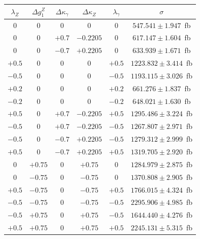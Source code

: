 \begin{table}[!ht]
  \begin{center}
  \begin{tabular} {|c c c|c c|c|}
\hline
  $\lambda_Z$ & $\Delta g^Z_1$ & $\Delta\kappa_{\gamma}$ & $\Delta\kappa_Z$ & $\lambda_{\gamma}$ & $\sigma$ \\
  \hline
  0           & 0              & 0                       & 0                & 0                  & $547.541\pm1.947$~fb \\
  0           & 0              & $+0.7$                  & $-0.2205$        & 0                  & $617.147\pm1.604$~fb \\
  0           & 0              & $-0.7$                  & $+0.2205$        & 0                  & $633.939\pm1.671$~fb \\
  $+0.5$      & 0              & 0                       & 0                & $+0.5$             & $1223.832\pm3.414$~fb \\
  $-0.5$      & 0              & 0                       & 0                & $-0.5$             & $1193.115\pm3.026$~fb \\
  $+0.2$      & 0              & 0                       & 0                & $+0.2$             & $661.276\pm1.837$~fb \\
  $-0.2$      & 0              & 0                       & 0                & $-0.2$             & $648.021\pm1.630$~fb \\
  $+0.5$      & 0              & $+0.7$                  & $-0.2205$        & $+0.5$             & $1295.486\pm3.224$~fb \\
  $-0.5$      & 0              & $+0.7$                  & $-0.2205$        & $-0.5$             & $1267.807\pm2.971$~fb \\
  $-0.5$      & 0              & $-0.7$                  & $+0.2205$        & $-0.5$             & $1279.312\pm2.999$~fb \\
  $+0.5$      & 0              & $-0.7$                  & $+0.2205$        & $+0.5$             & $1319.705\pm2.920$~fb \\
  0           & $+0.75$        & 0                       & $+0.75$          & 0                  & $1284.979\pm2.875$~fb \\
  0           & $-0.75$        & 0                       & $-0.75$          & 0                  & $1370.808\pm2.905$~fb \\
  $+0.5$      & $-0.75$        & 0                       & $-0.75$          & $+0.5$             & $1766.015\pm4.324$~fb \\
  $-0.5$      & $-0.75$        & 0                       & $-0.75$          & $-0.5$             & $2295.906\pm4.985$~fb \\
  $-0.5$      & $+0.75$        & 0                       & $+0.75$          & $-0.5$             & $1644.440\pm4.276$~fb \\
  $+0.5$      & $+0.75$        & 0                       & $+0.75$          & $+0.5$             & $2245.131\pm5.315$~fb \\


\end{tabular}
\end{center}
\end{table}
